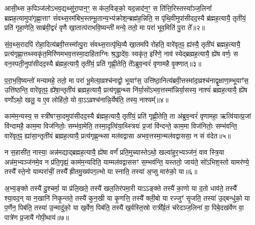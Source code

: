 आसी॒थ्स क॒पिञ्ज॑लो\-ऽभव॒द्यथ्सु॑रा॒पान॒ꣳ॒ स क॑ल॒विङ्को॒ यद॒न्नाद॑न॒ꣳ॒ स ति॑त्ति॒रिस्तस्या᳚ञ्ज॒लिना᳚ ब्रह्मह॒त्यामुपा॑गृह्णा॒त्ताꣳ सं॑वथ्स॒रम॑बिभ॒स्तम्भू॒तान्य॒भ्य॑क्रोश॒न्ब्रह्म॑ह॒न्निति॒ स पृ॑थि॒वीमुपा॑सीदद॒स्यै ब्र॑ह्मह॒त्यायै॒ तृती॑यं॒ प्रति॑ गृहा॒णेति॒ साब्र॑वी॒द्वरं॑ वृणै खा॒तात्प॑राभवि॒ष्यन्ती॑ मन्ये॒ ततो॒ मा परा॑ भूव॒मिति॑ पु॒रा ते᳚॥२॥

सं॒व॒थ्स॒रादपि॑ रोहा॒दित्य॑ब्रवी॒त्तस्मा᳚त्पु॒रा सं॑वथ्स॒रात्पृ॑थि॒व्यै खा॒तमपि॑ रोहति॒ वारे॑वृत॒ꣴ॒ ह्य॑स्यै॒ तृती॑यं ब्रह्मह॒त्यायै॒ प्रत्य॑गृह्णा॒त्तथ्स्वकृ॑त॒मिरि॑णमभव॒त्तस्मा॒दाहि॑ताग्निः श्र॒द्धादे॑वः॒ स्वकृ॑त॒ इरि॑णे॒ नाव॑ स्येद्ब्रह्मह॒त्यायै॒ ह्ये॑ष वर्णः॒ स वन॒स्पती॒नुपा॑सीदद॒स्यै ब्र॑ह्मह॒त्यायै॒ तृती॑यं॒ प्रति॑ गृह्णी॒तेति॒ ते᳚\-ऽब्रुव॒न्वरं॑ वृणामहै वृ॒क्णात्॥३॥

प॒रा॒भ॒वि॒ष्यन्तो॑ मन्यामहे॒ ततो॒ मा परा॑ भू॒मेत्या॒व्रश्च॑नाद्वो॒ भूयाꣳ॑स॒ उत्ति॑ष्ठा॒नित्य॑ब्रवी॒त्तस्मा॑दा॒व्रश्च॑नाद्वृ॒क्षाणा॒म्भूयाꣳ॑स॒ उत्ति॑ष्ठन्ति॒ वारे॑वृत॒ꣴ॒ ह्ये॑षा॒न्तृती॑यं ब्रह्मह॒त्यायै॒ प्रत्य॑गृह्ण॒न्थ्स नि॑र्या॒सो॑\-ऽभव॒त्तस्मा᳚न्निर्या॒सस्य॒ नाश्यं॑ ब्रह्मह॒त्यायै॒ ह्ये॑ष वर्णो\-ऽथो॒ खलु॒ य ए॒व लोहि॑तो॒ यो वा॒\-ऽ\-ऽव्रश्च॑नान्नि॒र्येष॑ति॒ तस्य॒ नाश्यम्᳚॥४॥

काम॑म॒न्यस्य॒ स स्त्री॑षꣳसा॒दमुपा॑सीदद॒स्यै ब्र॑ह्मह॒त्यायै॒ तृती॑यं॒ प्रति॑ गृह्णी॒तेति॒ ता अ॑ब्रुव॒न्वरं॑ वृणामहा॒ ऋत्वि॑यात्प्र॒जां वि॑न्दामहै॒ काम॒मा विज॑नितोः॒ सम्भ॑वा॒मेति॒ तस्मा॒दृत्वि॑या॒थ्स्त्रियः॑ प्र॒जां वि॑न्दन्ते॒ काम॒मा विज॑नितोः॒ सम्भ॑वन्ति॒ वारे॑वृत॒ꣴ॒ ह्या॑सा॒न्तृती॑यं ब्रह्मह॒त्यायै॒ प्रत्य॑गृह्ण॒न्थ्सा मल॑वद्वासा अभव॒त्तस्मा॒न्मल॑वद्वाससा॒ न सं व॑देत॥५॥

न स॒हासी॑त॒ नास्या॒ अन्न॑मद्याद्ब्रह्मह॒त्यायै॒ ह्ये॑षा वर्णं॑ प्रति॒मुच्यास्ते\-ऽथो॒ खल्वा॑हुर॒भ्यञ्ज॑नं॒ वाव स्त्रि॒या अन्न॑म॒भ्यञ्ज॑नमे॒व न प्र॑ति॒गृह्यं॒ काम॑म॒न्यदिति॒ याम्मल॑वद्वाससꣳ स॒म्भव॑न्ति॒ यस्ततो॒ जाय॑ते॒ सो॑\-ऽभिश॒स्तो यामर॑ण्ये॒ तस्यै᳚ स्ते॒नो याम्परा॑चीं॒ तस्यै᳚ ह्रीतमु॒ख्य॑पग॒ल्भो या स्नाति॒ तस्या॑ अ॒प्सु मारु॑को॒ या॥६॥

अ॒भ्य॒ङ्क्ते तस्यै॑ दु॒श्चर्मा॒ या प्र॑लि॒खते॒ तस्यै॑ खल॒तिर॑पमा॒री या\-ऽ\-ऽङ्क्ते तस्यै॑ का॒णो या द॒तो धाव॑ते॒ तस्यै᳚ श्या॒वद॒न् या न॒खानि॑ निकृ॒न्तते॒ तस्यै॑ कुन॒खी या कृ॒णत्ति॒ तस्यै᳚ क्ली॒बो या रज्जुꣳ॑ सृ॒जति॒ तस्या॑ उ॒द्बन्धु॑को॒ या प॒र्णेन॒ पिब॑ति॒ तस्या॑ उ॒न्मादु॑को॒ या ख॒र्वेण॒ पिब॑ति॒ तस्यै॑ ख॒र्वस्ति॒स्रो रात्री᳚र्व्र॒तं च॑रेदञ्ज॒लिना॑ वा॒ पिबे॒दख॑र्वेण वा॒ पात्रे॑ण प्र॒जायै॑ गोपी॒थाय॑॥७॥

{\anuvakamend[{यथ्सो॑म॒पान॑न्ते वृ॒क्णात्तस्य॒ नाश्यं॑ वदेत॒ मारु॑को॒ या\-ऽख॑र्वेण वा॒ त्रीणि॑ च॥१॥}]}

